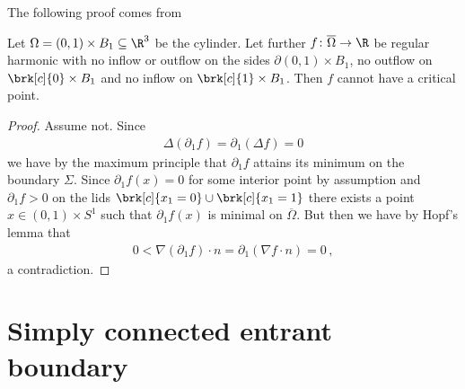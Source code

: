 The following proof comes from \cite{Wahlen2023}
\begin{proposition}
  Let $\Omega=(0,1)\times B_1\subseteq\R^3$ be the cylinder. Let further $f\colon\overline{\Omega}\to\R$ be regular 
  harmonic with no inflow or outflow on the sides 
  $\partial (0,1)\times B_1$, no outflow on $\brk[c]{0}\times B_1$ and no inflow on $\brk[c]{1}\times B_1$. 
  Then $f$ cannot have a critical point.
\end{proposition}
\begin{proof}
  Assume not. Since
  \begin{align*}
    \Delta(\partial_1f)=\partial_1(\Delta f)=0
  \end{align*}
  we have by the maximum principle that $\partial_1 f$ attains its minimum on the boundary $\Sigma$. Since $\partial_1 f(x)=0$ for some interior point 
  by assumption and $\partial_1 f>0$ on the lids $\brk[c]{x_1=0}\cup\brk[c]{x_1=1}$ there exists a point
  $x\in(0,1)\times S^1$ such that $\partial_1f(x)$ is minimal on $\overline{\Omega}$. But then we have by Hopf's lemma
  that
  \begin{align*}
    0<\nabla (\partial_1f)\cdot n=\partial_1(\nabla f\cdot n)=0\,,
  \end{align*}
  a contradiction.
\end{proof}

\section{Simply connected entrant boundary}

